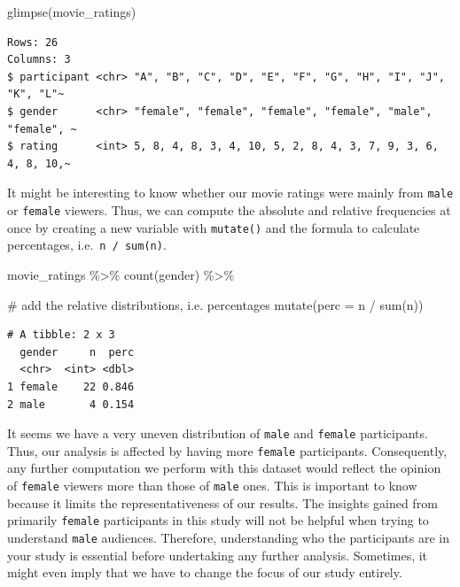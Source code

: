 \documentclass[
  letterpaper,
]{krantz}
\makeatletter
\newenvironment{Shaded}{\begin{snugshade}}{\end{snugshade}}
\newcommand{\AttributeTok}[1]{\textcolor[rgb]{0.40,0.45,0.13}{#1}}
\newcommand{\CommentTok}[1]{\textcolor[rgb]{0.37,0.37,0.37}{#1}}
\newcommand{\FunctionTok}[1]{\textcolor[rgb]{0.28,0.35,0.67}{#1}}
\newcommand{\NormalTok}[1]{\textcolor[rgb]{0.00,0.23,0.31}{#1}}
\newcommand{\SpecialCharTok}[1]{\textcolor[rgb]{0.37,0.37,0.37}{#1}}
\newenvironment{kframe}{%
\medskip{}
\setlength{\fboxsep}{.8em}
 \def\at@end@of@kframe{}%
 \ifinner\ifhmode%
  \def\at@end@of@kframe{\end{minipage}}%
  \begin{minipage}{\columnwidth}%
 \fi\fi%
 \def\FrameCommand##1{\hskip\@totalleftmargin \hskip-\fboxsep
 \colorbox{shadecolor}{##1}\hskip-\fboxsep
     \hskip-\linewidth \hskip-\@totalleftmargin \hskip\columnwidth}%
 \MakeFramed {\advance\hsize-\width
   \@totalleftmargin\z@ \linewidth\hsize
   \@setminipage}}%
 {\par\unskip\endMakeFramed%
 \at@end@of@kframe}
\renewenvironment{Shaded}{\begin{kframe}}{\end{kframe}}
\makeatother
\begin{document}
\begin{Shaded}
\begin{Highlighting}[]
\FunctionTok{glimpse}\NormalTok{(movie\_ratings)}
\end{Highlighting}
\end{Shaded}

\begin{verbatim}
Rows: 26
Columns: 3
$ participant <chr> "A", "B", "C", "D", "E", "F", "G", "H", "I", "J", "K", "L"~
$ gender      <chr> "female", "female", "female", "female", "male", "female", ~
$ rating      <int> 5, 8, 4, 8, 3, 4, 10, 5, 2, 8, 4, 3, 7, 9, 3, 6, 4, 8, 10,~
\end{verbatim}

It might be interesting to know whether our movie ratings were mainly
from \texttt{male} or \texttt{female} viewers. Thus, we can compute the
absolute and relative frequencies at once by creating a new variable
with \texttt{mutate()} and the formula to calculate percentages,
i.e.~\texttt{n\ /\ sum(n)}.

\begin{Shaded}
\begin{Highlighting}[]
\NormalTok{movie\_ratings }\SpecialCharTok{\%\textgreater{}\%}
  \FunctionTok{count}\NormalTok{(gender) }\SpecialCharTok{\%\textgreater{}\%}
  
  \CommentTok{\# add the relative distributions, i.e. percentages}
  \FunctionTok{mutate}\NormalTok{(}\AttributeTok{perc =}\NormalTok{ n }\SpecialCharTok{/} \FunctionTok{sum}\NormalTok{(n))}
\end{Highlighting}
\end{Shaded}

\begin{verbatim}
# A tibble: 2 x 3
  gender     n  perc
  <chr>  <int> <dbl>
1 female    22 0.846
2 male       4 0.154
\end{verbatim}

It seems we have a very uneven distribution of \texttt{male} and
\texttt{female} participants. Thus, our analysis is affected by having
more \texttt{female} participants. Consequently, any further computation
we perform with this dataset would reflect the opinion of
\texttt{female} viewers more than those of \texttt{male} ones. This is
important to know because it limits the representativeness of our
results. The insights gained from primarily \texttt{female} participants
in this study will not be helpful when trying to understand
\texttt{male} audiences. Therefore, understanding who the participants
are in your study is essential before undertaking any further analysis.
Sometimes, it might even imply that we have to change the focus of our
study entirely.
\end{document}
